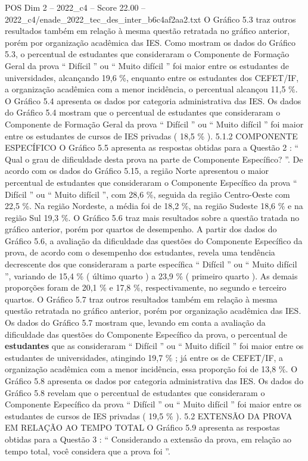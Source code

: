 \begin{textsample}{POS Dim 2 – 2022\_c4 – Score 22.00 – 2022\_c4/enade\_2022\_tec\_des\_inter\_b6c4af2aa2.txt}
O Gráfico 5.3 traz outros resultados também em relação à mesma questão retratada no gráfico anterior, porém por organização acadêmica das IES.
Como mostram os dados do Gráfico 5.3, o percentual de estudantes que consideraram o Componente de Formação Geral da prova “ Difícil ” ou “ Muito difícil ” foi maior entre os estudantes de universidades, alcançando 19,6 \%, enquanto entre os estudantes dos CEFET/IF, a organização acadêmica com a menor incidência, o percentual alcançou 11,5 \%.
O Gráfico 5.4 apresenta os dados por categoria administrativa das IES.
Os dados do Gráfico 5.4 mostram que o percentual de estudantes que consideraram o Componente de Formação Geral da prova “ Difícil ” ou “ Muito difícil ” foi maior entre os estudantes de cursos de IES privadas ( 18,5 \% ). 5.1.2 COMPONENTE ESPECÍFICO O Gráfico 5.5 apresenta as respostas obtidas para a Questão 2 : “ Qual o grau de dificuldade desta prova na parte de Componente Específico? ”.
De acordo com os dados do Gráfico 5.15, a região Norte apresentou o maior percentual de estudantes que consideraram o Componente Específico da prova “ Difícil ” ou “ Muito difícil ”, com 28,6 \%, seguida da região Centro-Oeste com 22,5 \%.
Na região Nordeste, a média foi de 18,2 \%, na região Sudeste 18,6 \% e na região Sul 19,3 \%.
O Gráfico 5.6 traz mais resultados sobre a questão tratada no gráfico anterior, porém por quartos de desempenho.
A partir dos dados do Gráfico 5.6, a avaliação da dificuldade das questões do Componente Específico da prova, de acordo com o desempenho dos estudantes, revela uma tendência decrescente dos que consideraram a parte específica “ Difícil ” ou “ Muito difícil ”, variando de 15,4 \% ( último quarto ) a 23,9 \% ( primeiro quarto ).
As demais proporções foram de 20,1 \% e 17,8 \%, respectivamente, no segundo e terceiro quartos.
O Gráfico 5.7 traz outros resultados também em relação à mesma questão retratada no gráfico anterior, porém por organização acadêmica das IES.
Os dados do Gráfico 5.7 mostram que, levando em conta a avaliação da dificuldade das questões do Componente Específico da prova, o percentual de \textbf{estudantes} que as consideraram “ Difícil ” ou “ Muito difícil ” foi maior entre os estudantes de universidades, atingindo 19,7 \% ; já entre os de CEFET/IF, a organização acadêmica com a menor incidência, essa proporção foi de 13,8 \%.
O Gráfico 5.8 apresenta os dados por categoria administrativa das IES.
Os dados do Gráfico 5.8 revelam que o percentual de estudantes que consideraram o Componente Específico da prova “ Difícil ” ou “ Muito difícil ” foi maior entre os estudantes de cursos de IES privadas ( 19,5 \% ). 5.2 EXTENSÃO DA PROVA EM RELAÇÃO AO TEMPO TOTAL O Gráfico 5.9 apresenta as respostas obtidas para a Questão 3 : “ Considerando a extensão da prova, em relação ao tempo total, você considera que a prova foi ”.

\end{textsample}
